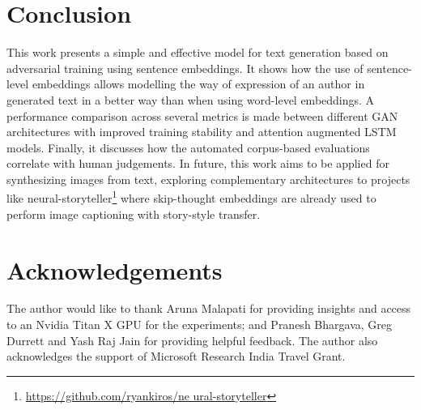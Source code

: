 \documentclass[11pt,a4paper]{article}
\begin{document}
\section{Conclusion}
This work presents a simple and effective model for text generation based on adversarial 
training using sentence embeddings. It shows how the use of sentence-level embeddings allows modelling the way of expression of an author in generated text in a better way than when using word-level 
embeddings. A performance comparison across several metrics is made between different GAN 
architectures with improved training stability and attention augmented LSTM models. Finally, it discusses how the automated corpus-based evaluations correlate with human judgements. In 
future, this work aims to be applied for synthesizing images from text, exploring
complementary architectures to projects like 
neural-storyteller\footnote{\url{https://github.com/ryankiros/ne
ural-storyteller}} where skip-thought embeddings are already 
used to perform image captioning with story-style transfer.
\pagebreak

\section*{Acknowledgements}
The author would like to thank Aruna Malapati for providing insights and access to an Nvidia Titan X GPU for the experiments; and Pranesh Bhargava, Greg Durrett and Yash Raj Jain for providing helpful feedback. The author also acknowledges the support of Microsoft Research India Travel Grant.
 
 


\end{document}

